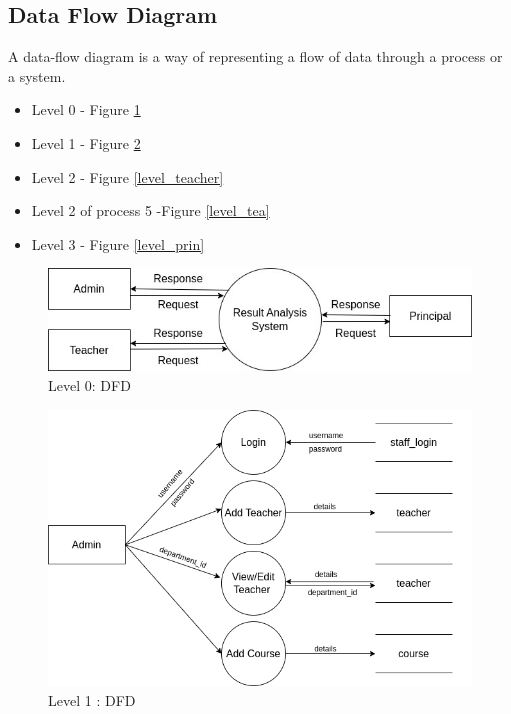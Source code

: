 \documentclass{nascproject}
\begin{document}
\subsection{Data Flow Diagram}
A data-flow diagram is a way of representing a flow of data through a process or a system. 
\begin{itemize}
	\item Level 0 - Figure \ref{level_zero}
	\item Level 1 - Figure \ref{level_one}
	\item Level 2 - Figure \ref{level_teacher}
	\item Level 2 of process 5 -Figure \ref{level_tea}
	\item Level 3 - Figure \ref{level_prin}
\end{itemize}
\begin{figure}
	\centering
	\includegraphics[width=1\linewidth]{level_zero.jpg}
	\caption{Level 0: DFD}
	
	\label{level_zero}
\end{figure}
\begin{figure}
	\centering
	\includegraphics[width=1\linewidth]{level_admin.png}
	\caption{Level 1 : DFD}
	\label{level_one}
\end{figure}
\end{document}

